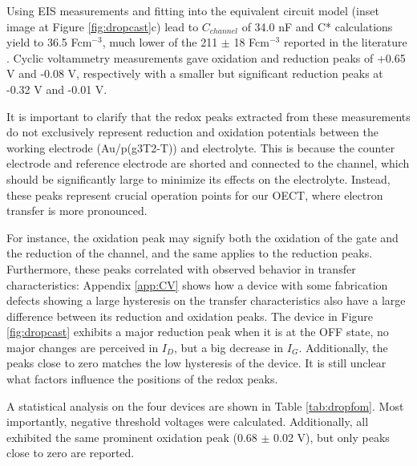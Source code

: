 Using EIS measurements and fitting into the equivalent circuit model (inset image at Figure \ref{fig:dropcast}c) lead to $C_{channel}$ of 34.0 nF and C* calculations yield to 36.5 Fcm$^{-3}$, much lower of the 211 $\pm$ 18 Fcm$^{-3}$ reported in the literature \cite{moserEthyleneGlycolBasedSide2020}. Cyclic voltammetry measurements gave oxidation and reduction peaks of +0.65 V and -0.08 V, respectively with a smaller but significant reduction peaks at -0.32 V and -0.01 V.

It is important to clarify that the redox peaks extracted from these measurements do not exclusively represent reduction and oxidation potentials between the working electrode (Au/p(g3T2-T)) and electrolyte. This is because the counter electrode and reference electrode are shorted and connected to the channel, which should be significantly large to minimize its effects on the electrolyte. Instead, these peaks represent crucial operation points for our OECT, where electron transfer is more pronounced.

For instance, the oxidation peak may signify both the oxidation of the gate and the reduction of the channel, and the same applies to the reduction peaks. Furthermore, these peaks correlated with observed behavior in transfer characteristics: Appendix \ref{app:CV} shows how a device with some fabrication defects showing a large hysteresis on the transfer characteristics also have a large difference between its reduction and oxidation peaks. The device in Figure \ref{fig:dropcast} exhibits a major reduction peak when it is at the OFF state, no major changes are perceived in $I_{D}$, but a big decrease in $I_{G}$. Additionally, the peaks close to zero matches the low hysteresis of the device. It is still unclear what factors influence the positions of the redox peaks. %


A statistical analysis on the four devices are shown in Table \ref{tab:dropfom}. Most importantly, negative threshold voltages were calculated. Additionally, all exhibited the same prominent oxidation peak (0.68 $\pm$ 0.02 V), but only peaks close to zero are reported. %


